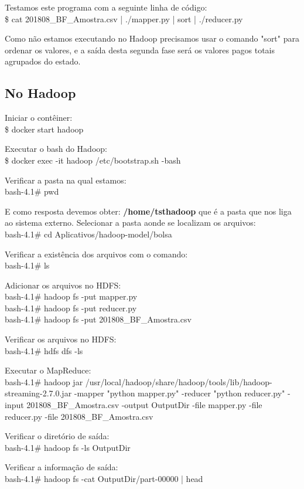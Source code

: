 \documentclass[a4paper,11pt]{article}
\begin{document}
Testamos este programa com a seguinte linha de código: \\
{\ttfamily\$ cat 201808\_BF\_Amostra.csv | ./mapper.py | sort | ./reducer.py}

Como não estamos executando no Hadoop precisamos usar o comando "sort" para ordenar os valores, e a saída desta segunda fase será os valores pagos totais agrupados do estado.

\subsection{No Hadoop}
Iniciar o contêiner: \\
{\ttfamily\$ docker start hadoop}

Executar o bash do Hadoop: \\
{\ttfamily\$ docker exec -it hadoop /etc/bootstrap.sh -bash}

Verificar a pasta na qual estamos: \\
{\ttfamily bash-4.1\# pwd}

E como resposta devemos obter: \textbf{/home/tsthadoop} que é a pasta que nos liga ao sistema externo. Selecionar a pasta aonde se localizam os arquivos: \\
{\ttfamily bash-4.1\# cd Aplicativos/hadoop-model/bolsa}

Verificar a existência dos arquivos com o comando: \\
{\ttfamily bash-4.1\# ls}

Adicionar os arquivos no HDFS: \\
{\ttfamily bash-4.1\# hadoop fs -put mapper.py \\
bash-4.1\# hadoop fs -put reducer.py \\
bash-4.1\# hadoop fs -put 201808\_BF\_Amostra.csv}

Verificar os arquivos no HDFS: \\
{\ttfamily bash-4.1\# hdfs dfs -ls}

Executar o MapReduce: \\
{\ttfamily bash-4.1\# hadoop jar /usr/local/hadoop/share/hadoop/tools/lib/hadoop-streaming-2.7.0.jar -mapper "python mapper.py" \- -reducer "python reducer.py" \- -input 201808\_BF\_Amostra.csv -output OutputDir -file mapper.py -file reducer.py -file 201808\_BF\_Amostra.csv}

Verificar o diretório de saída: \\
{\ttfamily bash-4.1\# hadoop fs -ls OutputDir}

Verificar a informação de saída: \\
{\ttfamily bash-4.1\# hadoop fs -cat OutputDir/part-00000 | head}
\end{document}

